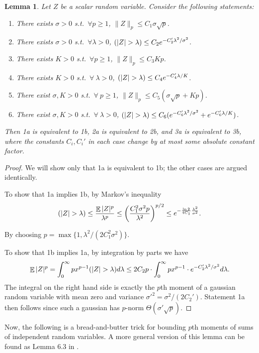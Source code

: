 \documentclass[12pt]{article}
\DeclareMathOperator*{\E}{\mathbb{E}}
\let\Pr\relax
\DeclareMathOperator*{\Pr}{\mathbb{P}}
\newtheorem{lemma}{Lemma}
\newcommand{\LemmaName}[1]{\label{lem:#1}}
\begin{document}
\begin{lemma}\LemmaName{byparts}
Let $Z$ be a scalar random variable. Consider the following statements:
\begin{enumerate}
\item[(1a)] There exists $\sigma>0$ s.t.\ $\forall p\ge 1$, $\|Z\|_p \le C_1 \sigma\sqrt{p}$.
\item[(1b)] There exists $\sigma>0$ s.t.\ $\forall \lambda > 0$, $\Pr(|Z| > \lambda) \le C_2 e^{-C_2'\lambda^2/\sigma^2}$.
\item[(2a)] There exists $K>0$ s.t.\ $\forall p\ge 1$, $\|Z\|_p \le C_3 Kp$.
\item[(2b)] There exists $K>0$ s.t.\ $\forall\ \lambda > 0$, $\Pr(|Z| > \lambda) \le C_4 e^{-C_4'\lambda/K}$.
\item[(3a)] There exist $\sigma, K>0$ s.t.\ $\forall\ p\ge 1$, $\|Z\|_p \le C_5 (\sigma\sqrt{p} + Kp)$.
\item[(3b)] There exist $\sigma, K>0$ s.t.\ $\forall\ \lambda > 0$, $\Pr(|Z| > \lambda) \le C_6 (e^{-C_6'\lambda^2/\sigma^2} + e^{-C_6'\lambda/K})$.
\end{enumerate}
Then 1a is equivalent to 1b, 2a is equivalent to 2b, and 3a is equivalent to 3b, where the constants $C_i, C_i'$ in each case change by at most some absolute constant factor.
\end{lemma}
\begin{proof}
We will show only that 1a is equivalent to 1b; the other cases are argued identically.

To show that 1a implies 1b, by Markov's inequality
\[
\Pr(|Z| > \lambda) \le  \frac {\E|Z|^p}{\lambda^p} \le \left(\frac{C_1^2 \sigma^2p}{\lambda^2}\right)^{p/2}\leq e^{-\frac{\ln 2}{4C_1}\frac{\lambda^2}{\sigma^2}}.
\]

By choosing $p = \max\{1, \lambda^2/(2C_1^2\sigma^2)\}$.

To show that 1b implies 1a, by integration by parts we have
$$
\E|Z|^p = \int_0^\infty px^{p-1} \Pr(|Z| > \lambda) d\lambda \le 2C_2 p \cdot \int_0^\infty px^{p-1} \cdot e^{-C_2'\lambda^2/\sigma^2} d\lambda.
$$
The integral on the right hand side is exactly the $p$th moment of a gaussian random variable with mean zero and variance $\sigma'^2 = \sigma^2 / (2C_2')$. Statement 1a then follows since such a gaussian has $p$-norm $\Theta(\sigma' \sqrt{p})$.
\end{proof}

Now, the following is a bread-and-butter trick for bounding $p$th moments of sums of independent random variables. A more general version of this lemma can be found as Lemma 6.3 in \cite{LedouxT91}.
\end{document}
